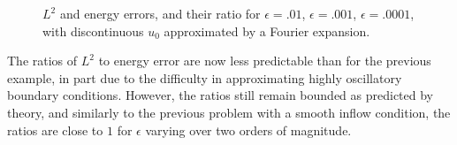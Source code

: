 \documentclass[11pt,onecolumn]{scrartcl}
\begin{document}
\begin{figure}[h!]
\centering
{}
\caption{$L^2$ and energy errors, and their ratio for $\epsilon=.01$, $\epsilon=.001$, $\epsilon=.0001$, with discontinuous $u_0$ approximated by a Fourier expansion. }
\label{disc_sol_fourier}
\end{figure}

The ratios of $L^2$ to energy error are now less predictable than for the previous example, in part due to the difficulty in approximating highly oscillatory boundary conditions. However, the ratios still remain bounded as predicted by theory, and similarly to the previous problem with a smooth inflow condition, the ratios are close to $1$ for $\epsilon$ varying over two orders of magnitude. 
\end{document}
